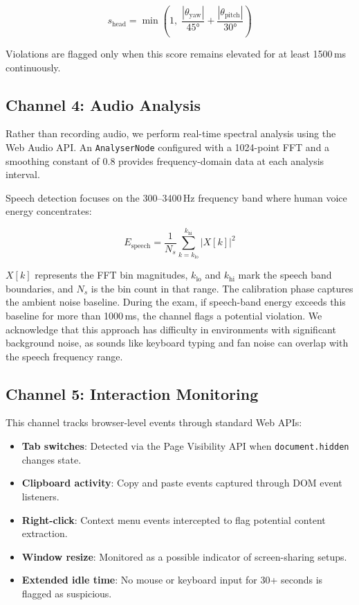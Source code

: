 \documentclass[conference]{IEEEtran}
\begin{document}
\begin{equation}
    s_{\text{head}} = \min\left(1, \; \frac{|\theta_{\text{yaw}}|}{45°} + \frac{|\theta_{\text{pitch}}|}{30°}\right)
\end{equation}

Violations are flagged only when this score remains elevated for at least 1500\,ms continuously.

\subsection{Channel 4: Audio Analysis}

Rather than recording audio, we perform real-time spectral analysis using the Web Audio API. An \texttt{AnalyserNode} configured with a 1024-point FFT and a smoothing constant of 0.8 provides frequency-domain data at each analysis interval.

Speech detection focuses on the 300--3400\,Hz frequency band where human voice energy concentrates:

\begin{equation}
    E_{\text{speech}} = \frac{1}{N_s}\sum_{k=k_{\text{lo}}}^{k_{\text{hi}}} |X[k]|^2
\end{equation}

$X[k]$ represents the FFT bin magnitudes, $k_{\text{lo}}$ and $k_{\text{hi}}$ mark the speech band boundaries, and $N_s$ is the bin count in that range. The calibration phase captures the ambient noise baseline. During the exam, if speech-band energy exceeds this baseline for more than 1000\,ms, the channel flags a potential violation. We acknowledge that this approach has difficulty in environments with significant background noise, as sounds like keyboard typing and fan noise can overlap with the speech frequency range.

\subsection{Channel 5: Interaction Monitoring}

This channel tracks browser-level events through standard Web APIs:

\begin{itemize}
    \item \textbf{Tab switches}: Detected via the Page Visibility API when \texttt{document.hidden} changes state.
    \item \textbf{Clipboard activity}: Copy and paste events captured through DOM event listeners.
    \item \textbf{Right-click}: Context menu events intercepted to flag potential content extraction.
    \item \textbf{Window resize}: Monitored as a possible indicator of screen-sharing setups.
    \item \textbf{Extended idle time}: No mouse or keyboard input for 30+ seconds is flagged as suspicious.
\end{itemize}
\end{document}
